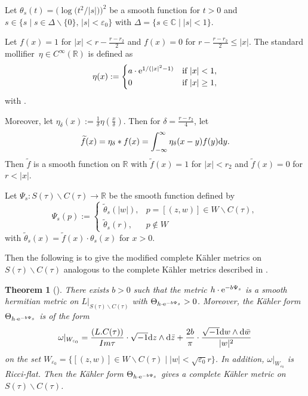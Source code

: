 \documentclass[10pt,a4paper]{amsart}
\numberwithin{equation}{section}
\newtheorem{Theorem}{Theorem}[section]
\def\operatorname#1{#1}
\begin{document}
Let $\theta_s(t)=\bigl(\log\bigl(t^2/|s|\bigr)\bigr)^2$ be a smooth function for $t>0$ and $s \in \{ s\mid s \in \Delta \backslash \{ 0 \},\, |s|<\varepsilon_0 \}$ with $\Delta = \{ s \in \mathbb{C} \mid |s|<1 \}$.

Let $f(x)=1$ for $|x|<r-\frac{r-r_2}{2}$ and $f(x)=0$ for $r-\frac{r-r_2}{2} \leq|x|$. The standard mollifier~${\eta \in C^\infty(\mathbb{R})}$ is defined as
\[\eta(x):=\begin{cases}
a\cdot {\rm e}^{1/(|x|^2-1)} & \text{if}\  |x|<1, \\
0 & \text{if}\  |x| \geq 1,
\end{cases}\]
with  \cite{Lawrence}.

Moreover, let $\eta_\delta(x):=\frac{1}{\delta}\eta(\frac{x}{\delta})$. Then for $\delta=\frac{r-r_2}{4}$, let
\[\widetilde{f}(x)=\eta_\delta * f(x)=\int^\infty_{-\infty}\eta_\delta(x-y)f(y){\rm d}y.\]
Then $\widetilde{f}$ is a smooth function on $\mathbb{R}$ with $\widetilde{f}(x)=1$ for $|x|<r_2$ and $\widetilde{f}(x)=0$ for $r<|x|$.

Let $\Psi_s\colon S(\tau) \backslash C(\tau) \rightarrow \mathbb{R}$ be the smooth function defined by
\[\Psi_s(p):= \begin{cases}
\widetilde{\theta}_s(|w|), & p=[(z,w)] \in W\backslash C(\tau), \\
\widetilde{\theta}_s(r), & p \notin W
\end{cases}\]
with $\widetilde{\theta}_s(x)=\widetilde{f}(x) \cdot \theta_s(x)$ for $x>0$.

Then the following is to give the modified complete K\"ahler metrics on $S(\tau)\backslash C(\tau)$ analogous to the complete K\"ahler metrics described in \cite{Takayuki-Takato2}.

\begin{Theorem}[{\cite{Takayuki-Takato2}}] \label{Theorem3.19}
 There exists $b>0$ such that the metric $h \cdot {\rm e}^{-b \Psi_s}$ is a smooth hermitian metric on $L|_{S(\tau)\backslash C(\tau)}$ with $\Theta_{h \cdot {\rm e}^{-b \Psi_s}}>0$. Moreover, the K\"ahler form $\Theta_{h \cdot {\rm e}^{-b \Psi_s}}$ is of the form
\[\omega|_{W_{\varepsilon_0}}=\frac{ (L.C(\tau))}{\operatorname{ Im}\tau}\cdot \sqrt{-1} {\rm d}z \wedge {\rm d} \bar{z}+\frac{2b}{\pi} \cdot \frac{\sqrt{-1}{\rm d}w \wedge {\rm d} \bar{w}}{|w|^2}\]
on the set $W_{\varepsilon_0}=\{ [(z,w)]\in W \backslash C(\tau)\mid |w|<\sqrt{\varepsilon_0}r \}$. In addition, $\omega|_{W_{\varepsilon_0}}$ is Ricci-flat. Then the K\"ahler form $\Theta_{h\cdot {\rm e}^{-b\Psi_s}}$ gives a complete K\"ahler metric on $S(\tau)\backslash C(\tau)$.
\end{Theorem}
\end{document}
